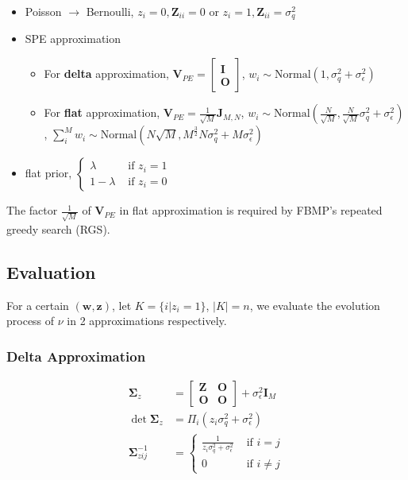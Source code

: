 \begin{itemize}
    \item Poisson $\rightarrow$ Bernoulli, $z_i=0,\bm{Z}_{ii}=0$ or $z_i=1,\bm{Z}_{ii}=\sigma_q^2$
    \item SPE approximation
    \begin{itemize}
    \item For \textbf{delta} approximation, $\bm{V}_{PE}=\begin{bmatrix}\bm{I} \\\bm{O}\end{bmatrix}$, $w_i\sim \mathrm{Normal}(1,\sigma_q^2+\sigma_\epsilon^2)$
    \item For \textbf{flat} approximation, $\bm{V}_{PE}=\frac{1}{\sqrt{M}}\bm{J}_{M,N}$, $w_i\sim \mathrm{Normal}(\frac{N}{\sqrt{M}},\frac{N}{\sqrt{M}}\sigma_q^2+\sigma_\epsilon^2)$, $\sum_i^M w_i\sim \mathrm{Normal}(N\sqrt{M},M^{\frac{3}{2}}N\sigma_q^2+M\sigma_\epsilon^2)$
    \end{itemize}
    \item flat prior, $\begin{cases}
        \lambda & \text{ if } z_i=1 \\ 
        1-\lambda & \text{ if } z_i=0 
    \end{cases}$
\end{itemize}

The factor $\frac{1}{\sqrt{M}}$ of $\bm{V}_{PE}$ in flat approximation is required by FBMP's repeated greedy search (RGS). 

\subsection{Evaluation}

For a certain $(\bm{w}, \bm{z})$, let $K=\{i|z_i=1\}$, $|K|=n$, we evaluate the evolution process of $\nu$ in 2 approximations respectively. 

\subsubsection{Delta Approximation}

\begin{equation}
\begin{aligned}
    \bm{\Sigma}_z &= \begin{bmatrix}
        \bm{Z} & \bm{O} \\
        \bm{O} & \bm{O}
    \end{bmatrix} + \sigma_\epsilon^2\bm{I}_M \\
    \det\bm{\Sigma}_z &= \Pi_i (z_i\sigma_q^2+\sigma_\epsilon^2) \\
    \bm{\Sigma}_{zij}^{-1} &= \begin{cases}
        \frac{1}{z_i\sigma_q^2+\sigma_\epsilon^2} & \text{ if }  i=j \\ 
        0 & \text{ if }  i\neq j 
    \end{cases}
\end{aligned}
\end{equation}


